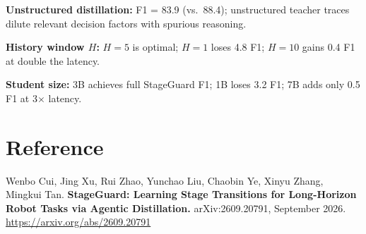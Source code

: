 \documentclass[10pt,twocolumn]{article}
\begin{document}
\textbf{Unstructured distillation:} F1 = 83.9 (vs.\ 88.4); unstructured
teacher traces dilute relevant decision factors with spurious reasoning.

\textbf{History window $H$:} $H=5$ is optimal; $H=1$ loses 4.8 F1;
$H=10$ gains 0.4 F1 at double the latency.

\textbf{Student size:} 3B achieves full StageGuard F1; 1B loses 3.2 F1;
7B adds only 0.5 F1 at 3$\times$ latency.

\section*{Reference}

Wenbo Cui, Jing Xu, Rui Zhao, Yunchao Liu, Chaobin Ye, Xinyu Zhang,
Mingkui Tan.
\textbf{StageGuard: Learning Stage Transitions for Long-Horizon Robot Tasks
via Agentic Distillation.}
arXiv:2609.20791, September 2026.
\url{https://arxiv.org/abs/2609.20791}
\end{document}
